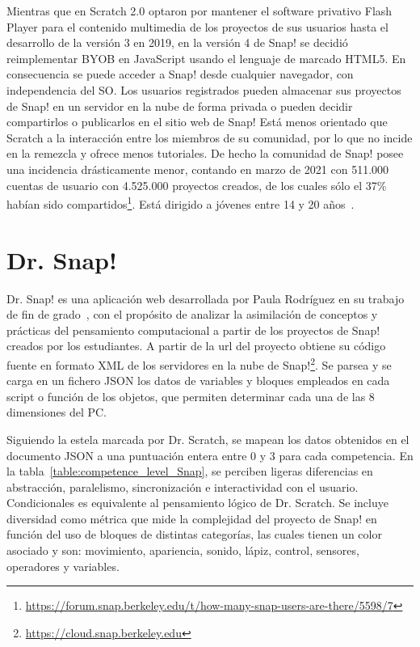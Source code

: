 \documentclass[a4paper, 12pt]{book}
\begin{document}
Mientras que en Scratch 2.0 optaron por mantener el software privativo Flash Player para el contenido multimedia de los proyectos de sus usuarios hasta el desarrollo de la versión 3 en 2019, en la versión 4 de Snap! se decidió reimplementar BYOB en JavaScript usando el lenguaje de marcado HTML5. En consecuencia se puede acceder a Snap! desde cualquier navegador, con independencia del SO. Los usuarios registrados pueden almacenar sus proyectos de Snap! en un servidor en la nube de forma privada o pueden decidir compartirlos o publicarlos en el sitio web de Snap! Está menos orientado que Scratch a la interacción entre los miembros de su comunidad, por lo que no incide en la remezcla y ofrece menos tutoriales. De hecho la comunidad de Snap! posee una incidencia drásticamente menor, contando en marzo de 2021 con 511.000 cuentas de usuario con 4.525.000 proyectos creados, de los cuales sólo el 37\% habían sido compartidos\footnote{\url{https://forum.snap.berkeley.edu/t/how-many-snap-users-are-there/5598/7}}. Está dirigido a jóvenes entre 14 y 20 años~\cite{harvey2013snap}.
 
\section{Dr. Snap!}
\label{sec:dr_snap}

Dr. Snap! es una aplicación web desarrollada por Paula Rodríguez en su trabajo de fin de grado~\cite{martinez2021dr}, con el propósito de analizar la asimilación de conceptos y prácticas del pensamiento computacional a partir de los proyectos de Snap! creados por los estudiantes. A partir de la url del proyecto obtiene su código fuente en formato XML de los servidores en la nube de Snap!\footnote{\url{https://cloud.snap.berkeley.edu}}. Se parsea y se carga en un fichero JSON los datos de variables y bloques empleados en cada script o función de los objetos, que permiten determinar cada una de las 8 dimensiones del PC.

Siguiendo la estela marcada por Dr. Scratch, se mapean los datos obtenidos en el documento JSON a una puntuación entera entre 0 y 3 para cada competencia. En la tabla~\ref{table:competence_level_Snap}, se perciben ligeras diferencias en abstracción, paralelismo, sincronización e interactividad con el usuario. Condicionales es equivalente al pensamiento lógico de Dr. Scratch. Se incluye diversidad como métrica que mide la complejidad del proyecto de Snap! en función del uso de bloques de distintas categorías, las cuales tienen un color asociado y son: movimiento, apariencia, sonido, lápiz, control, sensores, operadores y variables.
\end{document}
